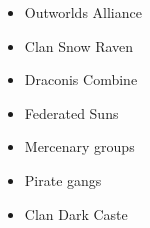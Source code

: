 
\begin{itemize}

\item Outworlds Alliance

\item Clan Snow Raven

\item Draconis Combine

\item Federated Suns

\item Mercenary groups

\item Pirate gangs

\item Clan Dark Caste


\end{itemize}

